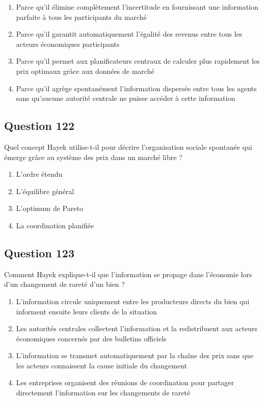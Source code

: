 \documentclass[12pt,a4paper]{article}
\begin{document}
\begin{enumerate}[label=\Alph*., leftmargin=*]
\item Parce qu'il élimine complètement l'incertitude en fournissant une information parfaite à tous les participants du marché
\item Parce qu'il garantit automatiquement l'égalité des revenus entre tous les acteurs économiques participants
\item Parce qu'il permet aux planificateurs centraux de calculer plus rapidement les prix optimaux grâce aux données de marché
\item Parce qu'il agrège spontanément l'information dispersée entre tous les agents sans qu'aucune autorité centrale ne puisse accéder à cette information
\end{enumerate}

\bigskip


\subsection*{Question 122}
Quel concept Hayek utilise-t-il pour décrire l'organisation sociale spontanée qui émerge grâce au système des prix dans un marché libre ?

\begin{enumerate}[label=\Alph*., leftmargin=*]
\item L'ordre étendu
\item L'équilibre général
\item L'optimum de Pareto
\item La coordination planifiée
\end{enumerate}

\bigskip


\subsection*{Question 123}
Comment Hayek explique-t-il que l'information se propage dans l'économie lors d'un changement de rareté d'un bien ?

\begin{enumerate}[label=\Alph*., leftmargin=*]
\item L'information circule uniquement entre les producteurs directs du bien qui informent ensuite leurs clients de la situation
\item Les autorités centrales collectent l'information et la redistribuent aux acteurs économiques concernés par des bulletins officiels
\item L'information se transmet automatiquement par la chaîne des prix sans que les acteurs connaissent la cause initiale du changement
\item Les entreprises organisent des réunions de coordination pour partager directement l'information sur les changements de rareté
\end{enumerate}
\end{document}
